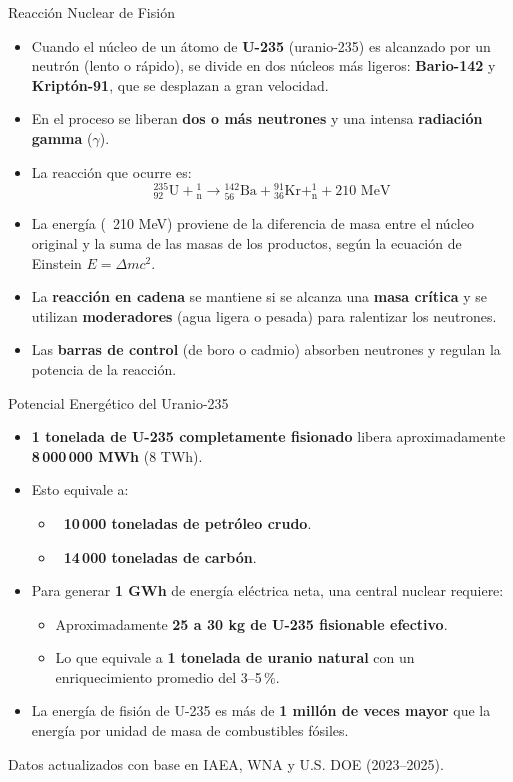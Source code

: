 \documentclass[main.tex]{subfiles}
\begin{document}
\begin{frame}{Reacción Nuclear de Fisión}
    \begin{itemize}
        \item Cuando el núcleo de un átomo de \textbf{U-235} (uranio-235) es alcanzado por un neutrón (lento o rápido), se divide en dos núcleos más ligeros: \textbf{Bario-142} y \textbf{Kriptón-91}, que se desplazan a gran velocidad.
        \item En el proceso se liberan \textbf{dos o más neutrones} y una intensa \textbf{radiación gamma} ($\gamma$).
        \item La reacción que ocurre es:
        \[
        {}^{235}_{92}\text{U} + {}^1_\text{n} \rightarrow {}^{142}_{56}\text{Ba} + {}^{91}_{36}\text{Kr} + ^1_\text{n} + \text{210 MeV}
        \]
        \item La energía (~210 MeV) proviene de la diferencia de masa entre el núcleo original y la suma de las masas de los productos, según la ecuación de Einstein $E = \Delta m c^2$.
        \small
        \item La \textbf{reacción en cadena} se mantiene si se alcanza una \textbf{masa crítica} y se utilizan \textbf{moderadores} (agua ligera o pesada) para ralentizar los neutrones.
        \item Las \textbf{barras de control} (de boro o cadmio) absorben neutrones y regulan la potencia de la reacción.
    \end{itemize}
\end{frame}


\begin{frame}{Potencial Energético del Uranio-235}
    \begin{itemize}
        \item \textbf{1 tonelada de U-235 completamente fisionado} libera aproximadamente \textbf{8\,000\,000 MWh} (8 TWh).
        \item Esto equivale a:
        \begin{itemize}
            \item \textbf{~10\,000 toneladas de petróleo crudo}.
            \item \textbf{~14\,000 toneladas de carbón}.
        \end{itemize}
        \item Para generar \textbf{1 GWh} de energía eléctrica neta, una central nuclear requiere:
        \begin{itemize}
            \item Aproximadamente \textbf{25 a 30 kg de U-235 fisionable efectivo}.
            \item Lo que equivale a \textbf{1 tonelada de uranio natural} con un enriquecimiento promedio del 3–5 \%.
        \end{itemize}
        \item La energía de fisión de U-235 es más de \textbf{1 millón de veces mayor} que la energía por unidad de masa de combustibles fósiles.
    \end{itemize}
    \vspace{0.5em}
    \small{Datos actualizados con base en IAEA, WNA y U.S. DOE (2023–2025).}
\end{frame}
\end{document}
